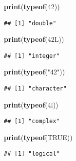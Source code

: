 \documentclass[
]{article}
\newenvironment{Shaded}{\begin{snugshade}}{\end{snugshade}}
\newcommand{\ConstantTok}[1]{\textcolor[rgb]{0.56,0.35,0.01}{#1}}
\newcommand{\DataTypeTok}[1]{\textcolor[rgb]{0.13,0.29,0.53}{#1}}
\newcommand{\DecValTok}[1]{\textcolor[rgb]{0.00,0.00,0.81}{#1}}
\newcommand{\FunctionTok}[1]{\textcolor[rgb]{0.13,0.29,0.53}{\textbf{#1}}}
\newcommand{\NormalTok}[1]{#1}
\newcommand{\StringTok}[1]{\textcolor[rgb]{0.31,0.60,0.02}{#1}}
\begin{document}
\begin{Shaded}
\begin{Highlighting}[]
\FunctionTok{print}\NormalTok{(}\FunctionTok{typeof}\NormalTok{(}\DecValTok{42}\NormalTok{))}
\end{Highlighting}
\end{Shaded}

\begin{verbatim}
## [1] "double"
\end{verbatim}

\begin{Shaded}
\begin{Highlighting}[]
\FunctionTok{print}\NormalTok{(}\FunctionTok{typeof}\NormalTok{(}\DecValTok{42}\DataTypeTok{L}\NormalTok{))}
\end{Highlighting}
\end{Shaded}

\begin{verbatim}
## [1] "integer"
\end{verbatim}

\begin{Shaded}
\begin{Highlighting}[]
\FunctionTok{print}\NormalTok{(}\FunctionTok{typeof}\NormalTok{(}\StringTok{"42"}\NormalTok{))}
\end{Highlighting}
\end{Shaded}

\begin{verbatim}
## [1] "character"
\end{verbatim}

\begin{Shaded}
\begin{Highlighting}[]
\FunctionTok{print}\NormalTok{(}\FunctionTok{typeof}\NormalTok{(}\DecValTok{4}\DataTypeTok{i}\NormalTok{))}
\end{Highlighting}
\end{Shaded}

\begin{verbatim}
## [1] "complex"
\end{verbatim}

\begin{Shaded}
\begin{Highlighting}[]
\FunctionTok{print}\NormalTok{(}\FunctionTok{typeof}\NormalTok{(}\ConstantTok{TRUE}\NormalTok{))}
\end{Highlighting}
\end{Shaded}

\begin{verbatim}
## [1] "logical"
\end{verbatim}
\end{document}
